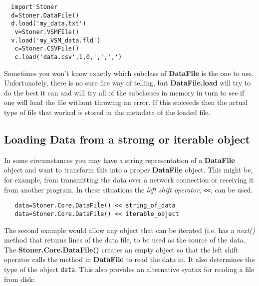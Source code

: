 \documentclass[a4paper,11pt]{scrartcl}
\begin{document}
\begin{lstlisting}
  import Stoner
  d=Stoner.DataFile()
  d.load('my_data.txt')
   v=Stoner.VSMFIle()
  v.load('my_VSM_data.fld')
   c=Stoner.CSVFile()
   c.load('data.csv',1,0,',',',')
\end{lstlisting}


Sometimes you won't know exactly which subclass of \textbf{DataFile} is the one to use. Unfortunately, there is no sure fire way of telling, but \textbf{DataFile.load} will try to do the best it can and will try all of the subclasses in memory in turn to see if one will load the file without throwing an error. If this succeeds then the actual type of file that worked is stored in the metadata of the loaded file.


\subsection{Loading Data from a stromg or iterable object}

In some circumstances you may have a string representation of a \textbf{DataFile} object and want to transform this into a proper \textbf{DataFile} object.
This might be, for example, from transmitting the data over a network connection or receiving it from another program. In these situations the \textit{left shift operator}, \verb#<<#, can be used.

\begin{lstlisting}
   data=Stoner.Core.DataFile() << string_of_data
   data=Stoner.Core.DataFile() << iterable_object
\end{lstlisting}

The second example would allow any object that can be iterated (i.e. has a \textit{next()} method that returns lines of the data file, to be used
as the source of the data. The \textbf{Stoner.Core.DataFile()} creates an empty object so that the left shift operator calls the method
in \textbf{DataFile} to read the data in. It also determines the type of the object \verb#data#. This also provides an alternative syntax for reading a file
from disk:
\end{document}
